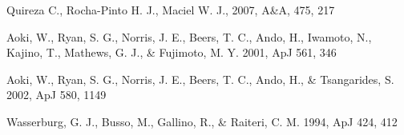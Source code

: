 Quireza C., Rocha-Pinto H. J., Maciel W. J., 2007, A\&A, 475, 217

 Aoki, W., Ryan, S. G., Norris, J. E., Beers, T. C., Ando, H., Iwamoto, N., Kajino, T., Mathews, G. J., \& Fujimoto, M. Y. 2001, ApJ 561, 346

 Aoki, W., Ryan, S. G., Norris, J. E., Beers, T. C., Ando, H., \& Tsangarides, S. 2002, ApJ 580, 1149 

 Wasserburg, G. J., Busso, M., Gallino, R., \& Raiteri, C. M. 1994, ApJ 424, 412
